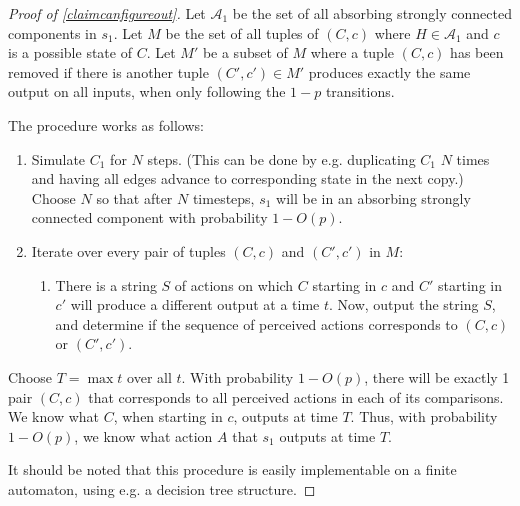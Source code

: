 \documentclass[11pt]{amsart}
\theoremstyle{definition}
\theoremstyle{remark}
\begin{document}
      \begin{proof}[Proof of \cref{claimcanfigureout}]
        
          Let $\mathcal{A}_1$ be the set of all absorbing strongly connected components in $s_1$.
           Let $M$ be the set of all tuples of $(C, c)$ where $H \in \mathcal{A}_1$ and $c$ is a possible state of $C$. Let $M'$ be a subset of $M$ where a tuple $(C, c)$ has been removed if there is another tuple $(C', c') \in M'$ produces exactly the same output on all inputs, when only following the $1-p$ transitions.

        The procedure works as follows:
        \begin{enumerate}
          \item Simulate $C_1$ for $N$ steps. (This can be done by e.g. duplicating $C_1$ $N$ times and having all edges advance to corresponding state in the next copy.) Choose $N$ so that after $N$ timesteps, $s_1$ will be in an absorbing strongly connected component with probability $1 - O(p)$. 
          \item Iterate over every pair of tuples $(C,c)$ and $(C', c')$ in $M$:
          \begin{enumerate}
            \item There is a string $S$ of actions on which $C$ starting in $c$ and $C'$ starting in $c'$ will produce a different output at a time $t$. Now, output the string $S$, and determine if the sequence of perceived actions corresponds to $(C,c)$ or $(C', c')$.
          \end{enumerate}
        \end{enumerate}
        Choose $T = \max t$ over all $t$.
         With probability $1 - O(p)$, there will be exactly 1 pair $(C, c)$ that corresponds to all perceived actions in each of its comparisons. We know what $C$, when starting in $c$, outputs at time $T$. Thus, with probability $1 - O(p)$, we know what action $A$ that $s_1$ outputs at time $T$.

        It should be noted that this procedure is easily implementable on a finite automaton, using e.g. a decision tree structure.
      \end{proof}


\end{document}
